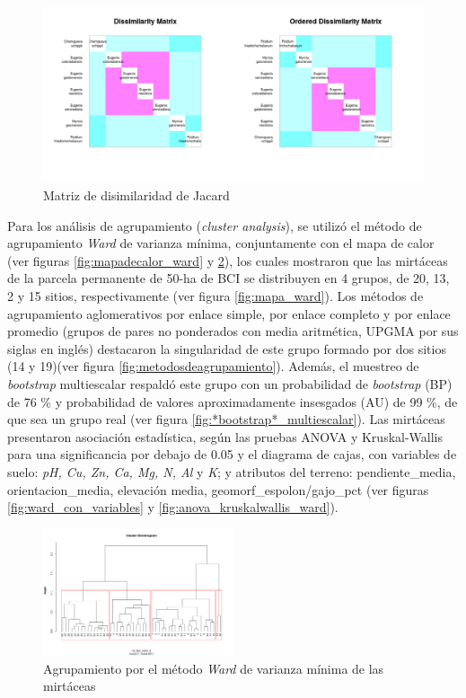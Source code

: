 \documentclass[11pt,]{article}
\begin{document}
\begin{figure}
\centering
\includegraphics{Disimilaridad_.png}
\caption{Matriz de disimilaridad de Jacard \label{fig:matriz_Jacard}}
\end{figure}

Para los análisis de agrupamiento (\emph{cluster analysis}), se utilizó
el método de agrupamiento \emph{Ward} de varianza mínima, conjuntamente
con el mapa de calor (ver figuras \ref{fig:mapadecalor_ward} y
\ref{fig:ward_fraccionado}), los cuales mostraron que las mirtáceas de
la parcela permanente de 50-ha de BCI se distribuyen en 4 grupos, de 20,
13, 2 y 15 sitios, respectivamente (ver figura \ref{fig:mapa_ward}). Los
métodos de agrupamiento aglomerativos por enlace simple, por enlace
completo y por enlace promedio (grupos de pares no ponderados con media
aritmética, UPGMA por sus siglas en inglés) destacaron la singularidad
de este grupo formado por dos sitios (14 y 19)(ver figura
\ref{fig:metodosdeagrupamiento}). Además, el muestreo de
\emph{bootstrap} multiescalar respaldó este grupo con un probabilidad de
\emph{bootstrap} (BP) de 76 \% y probabilidad de valores aproximadamente
insesgados (AU) de 99 \%, de que sea un grupo real (ver figura
\ref {fig:*bootstrap*_multiescalar}). Las mirtáceas presentaron
asociación estadística, según las pruebas ANOVA y Kruskal-Wallis para
una significancia por debajo de 0.05 y el diagrama de cajas, con
variables de suelo: \emph{pH, Cu, Zn, Ca, Mg, N, Al} y \emph{K}; y
atributos del terreno: pendiente\_media, orientacion\_media, elevación
media, geomorf\_espolon/gajo\_pct (ver figuras
\ref{fig:ward_con_variables} y \ref{fig:anova_kruskalwallis_ward}).

\begin{figure}
\centering
\includegraphics[width=0.50000\textwidth]{ward_fracionado.png}
\caption{Agrupamiento por el método \emph{Ward} de varianza mínima de
las mirtáceas \label{fig:ward_fraccionado}}
\end{figure}
\end{document}
